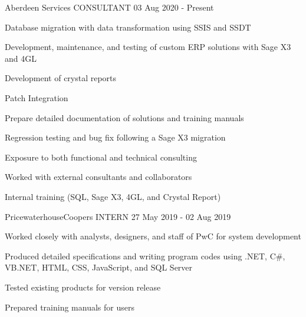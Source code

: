 

\begin{cventries}

  \cventry
    {Aberdeen Services} %
    {CONSULTANT} %
    {} %
    {03 Aug 2020 - Present} %
    {
      \begin{cvitems} %
        \item{Database migration with data transformation using SSIS and SSDT}
        \item {Development, maintenance, and testing of custom ERP solutions with Sage X3 and 4GL}
        \item {Development of crystal reports}
        \item {Patch Integration}
        \item {Prepare detailed documentation of solutions and training manuals}
        \item {Regression testing and bug fix following a Sage X3 migration}
        \item {Exposure to both functional and technical consulting}
        \item {Worked with external consultants and collaborators}
        \item {Internal training (SQL, Sage X3, 4GL, and Crystal Report)}
      \end{cvitems}
    }

  \cventry
    {PricewaterhouseCoopers} %
    {INTERN} %
    {} %
    {27 May 2019 - 02 Aug 2019} %
    {
      \begin{cvitems} %
        \item{Worked closely with analysts, designers, and staff of PwC for system development}
        \item {Produced detailed specifications and writing program codes using .NET, C\#, VB.NET, HTML, CSS, JavaScript, and SQL Server}
        \item {Tested existing products for version release}
        \item {Prepared training manuals for users}
      \end{cvitems}
    }

\end{cventries}

